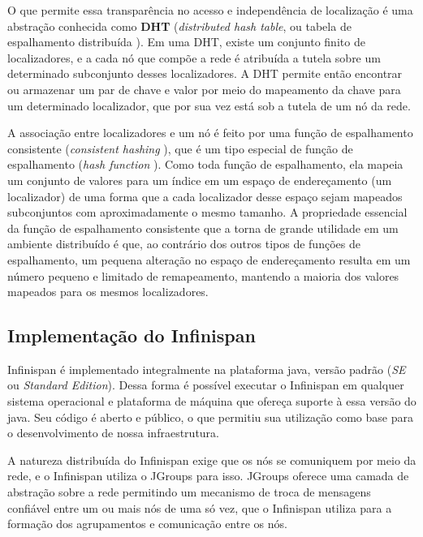 \documentclass[11pt,twoside,a4paper]{book}
\begin{document}
O que permite essa transparência no acesso e independência de localização é uma abstração conhecida como \textbf{DHT} (\emph{distributed hash table}, ou tabela de espalhamento distribuída \cite{dht}). Em uma DHT, existe um conjunto finito de localizadores, e a cada nó que compõe a rede é atribuída a tutela sobre um determinado subconjunto desses localizadores. A DHT permite então encontrar ou armazenar um par de chave e valor por meio do mapeamento da chave para um determinado localizador, que por sua vez está sob a tutela de um nó da rede.

A associação entre localizadores e um nó é feito por uma função de espalhamento consistente (\emph{consistent hashing} \cite{consistent_hashing}), que é um tipo especial de função de espalhamento (\emph{hash function} \cite{taocp_3}). Como toda função de espalhamento, ela mapeia um conjunto de valores para um índice em um espaço de endereçamento (um localizador) de uma forma que a cada localizador desse espaço sejam mapeados subconjuntos com aproximadamente o mesmo tamanho. A propriedade essencial da função de espalhamento consistente que a torna de grande utilidade em um ambiente distribuído é que, ao contrário dos outros tipos de funções de espalhamento, um pequena alteração no espaço de endereçamento resulta em um número pequeno e limitado de remapeamento, mantendo a maioria dos valores mapeados para os mesmos localizadores.

\subsection{Implementação do Infinispan}
\label{sec:implementacao_infinispan}
Infinispan é implementado integralmente na plataforma java, versão padrão (\emph{SE} ou \emph{Standard Edition}). Dessa forma é possível executar o Infinispan em qualquer sistema operacional e plataforma de máquina que ofereça suporte à essa versão do java. Seu código é aberto e público, o que permitiu sua utilização como base para o desenvolvimento de nossa infraestrutura.

A natureza distribuída do Infinispan exige que os nós se comuniquem por meio da rede, e o Infinispan utiliza o JGroups \cite{jgroups} para isso. JGroups oferece uma camada de abstração sobre a rede permitindo um mecanismo de troca de mensagens confiável entre um ou mais nós de uma só vez, que o Infinispan utiliza para a formação dos agrupamentos e comunicação entre os nós.
\end{document}
